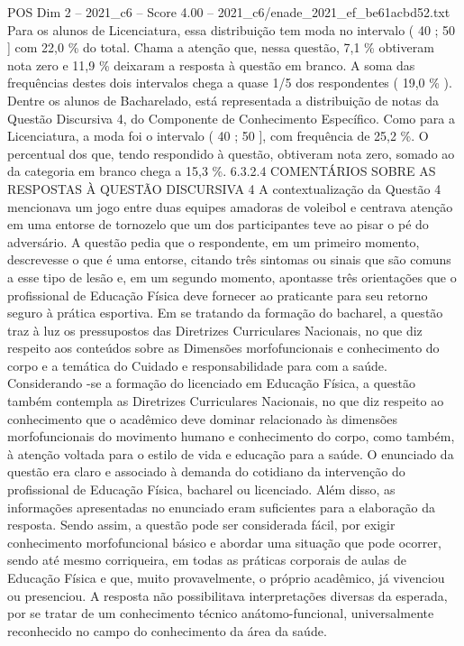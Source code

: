\begin{textsample}{POS Dim 2 – 2021\_c6 – Score 4.00 – 2021\_c6/enade\_2021\_ef\_be61acbd52.txt}
Para os alunos de Licenciatura, essa distribuição tem moda no intervalo ( 40 ; 50 ] com 22,0 \% do total.
Chama a atenção que, nessa questão, 7,1 \% obtiveram nota zero e 11,9 \% deixaram a resposta à questão em branco.
A soma das frequências destes dois intervalos chega a quase 1/5 dos respondentes ( 19,0 \% ).
Dentre os alunos de Bacharelado, está representada a distribuição de notas da Questão Discursiva 4, do Componente de Conhecimento Específico.
Como para a Licenciatura, a moda foi o intervalo ( 40 ; 50 ], com frequência de 25,2 \%.
O percentual dos que, tendo respondido à questão, obtiveram nota zero, somado ao da categoria em branco chega a 15,3 \%. 6.3.2.4 COMENTÁRIOS SOBRE AS RESPOSTAS À QUESTÃO DISCURSIVA 4 A contextualização da Questão 4 mencionava um jogo entre duas equipes amadoras de voleibol e centrava atenção em uma entorse de tornozelo que um dos participantes teve ao pisar o pé do adversário.
A questão pedia que o respondente, em um primeiro momento, descrevesse o que é uma entorse, citando três sintomas ou sinais que são comuns a esse tipo de lesão e, em um segundo momento, apontasse três orientações que o profissional de Educação Física deve fornecer ao praticante para seu retorno seguro à prática esportiva.
Em se tratando da formação do bacharel, a questão traz à luz os pressupostos das Diretrizes Curriculares Nacionais, no que diz respeito aos conteúdos sobre as Dimensões morfofuncionais e conhecimento do corpo e a temática do Cuidado e responsabilidade para com a saúde.
Considerando -se a formação do licenciado em Educação Física, a questão também contempla as Diretrizes Curriculares Nacionais, no que diz respeito ao conhecimento que o acadêmico deve dominar relacionado às dimensões morfofuncionais do movimento humano e conhecimento do corpo, como também, à atenção voltada para o estilo de vida e educação para a saúde.
O enunciado da questão era claro e associado à demanda do cotidiano da intervenção do profissional de Educação Física, bacharel ou licenciado.
Além disso, as informações apresentadas no enunciado eram suficientes para a elaboração da resposta.
Sendo assim, a questão pode ser considerada fácil, por exigir conhecimento morfofuncional básico e abordar uma situação que pode ocorrer, sendo até mesmo corriqueira, em todas as práticas corporais de aulas de Educação Física e que, muito provavelmente, o próprio acadêmico, já vivenciou ou presenciou.
A resposta não possibilitava interpretações diversas da esperada, por se tratar de um conhecimento técnico anátomo-funcional, universalmente reconhecido no campo do conhecimento da área da saúde.

\end{textsample}
